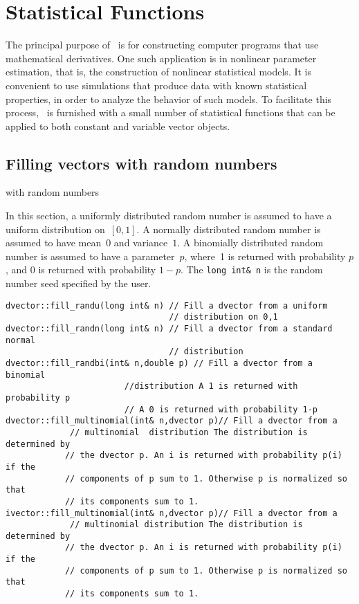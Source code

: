 \documentclass{admbmanual}
\begin{document}

\chapter{Statistical Functions}

The principal purpose of \scAD\ is for constructing computer programs that use
mathematical derivatives. One such application is in nonlinear parameter
estimation, that is, the construction of nonlinear statistical models. It is
convenient to use simulations that produce data with known statistical
properties, in order to analyze the behavior of such models. To facilitate this
process, \scAD\ is furnished with a small number of statistical functions that
can be applied to both constant and variable vector objects.

\section{Filling vectors with random numbers}
 {with random numbers}

In this section, a uniformly distributed random number is assumed to have a
uniform distribution on~$[0,1]$. A normally distributed random number is assumed
to have mean~$0$ and variance~$1$. A binomially distributed random number is
assumed to have a parameter~$p$, where~1 is returned with probability $p$, and
$0$ is returned with probability $1-p$. The \texttt{long~int\&~n} is the random
number seed specified by the user.

\begin{lstlisting}
dvector::fill_randu(long int& n) // Fill a dvector from a uniform
                                 // distribution on 0,1
dvector::fill_randn(long int& n) // Fill a dvector from a standard normal
                                 // distribution
dvector::fill_randbi(int& n,double p) // Fill a dvector from a binomial
                        //distribution A 1 is returned with probability p
                        // A 0 is returned with probability 1-p
dvector::fill_multinomial(int& n,dvector p)// Fill a dvector from a
             // multinomial  distribution The distribution is determined by
            // the dvector p. An i is returned with probability p(i) if the
            // components of p sum to 1. Otherwise p is normalized so that
            // its components sum to 1.
ivector::fill_multinomial(int& n,dvector p)// Fill a dvector from a
             // multinomial distribution The distribution is determined by
            // the dvector p. An i is returned with probability p(i) if the
            // components of p sum to 1. Otherwise p is normalized so that
            // its components sum to 1.
\end{lstlisting}
\end{document}
